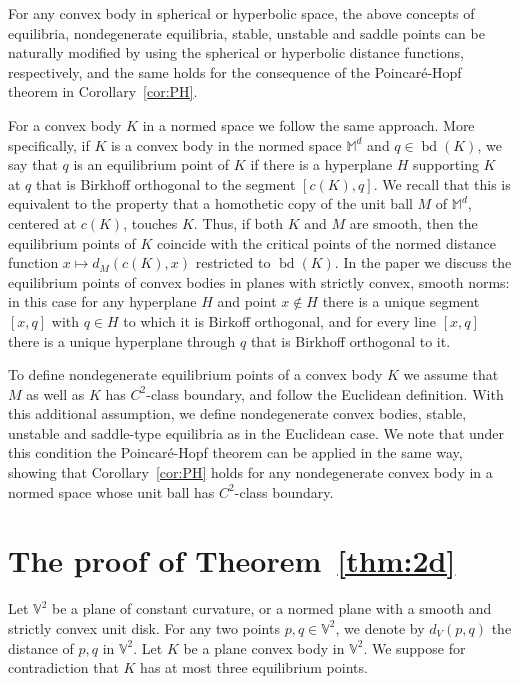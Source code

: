 \documentclass[twoside]{amsart}
\theoremstyle{plain}
\theoremstyle{definition}
\numberwithin{equation}{section}
\newcommand{\MM}{\mathbb{M}}
\newcommand{\V}{\mathbb{V}}
\DeclareMathOperator{\bd}{bd}
\begin{document}
For any convex body in spherical or hyperbolic space, the above concepts of equilibria, nondegenerate equilibria, stable, unstable and saddle points can be naturally modified by using the spherical or hyperbolic distance functions, respectively, and the same holds for the consequence of the Poincar\'e-Hopf theorem in Corollary~\ref{cor:PH}.

For a convex body $K$ in a normed space we follow the same approach. More specifically, if $K$ is a convex body in the normed space $\MM^d$ and $q \in \bd(K)$, we say that $q$ is an equilibrium point of $K$ if there is a hyperplane $H$ supporting $K$ at $q$ that is Birkhoff orthogonal to the segment $[c(K),q]$. We recall that this is equivalent to the property that a homothetic copy of the unit ball $M$ of $\MM^d$, centered at $c(K)$, touches $K$. Thus, if both $K$ and $M$ are smooth, then the equilibrium points of $K$ coincide with the critical points of the normed distance function $x \mapsto d_M(c(K),x)$ restricted to $\bd(K)$.
In the paper we discuss the equilibrium points of convex bodies in planes with strictly convex, smooth norms: in this case for any hyperplane $H$ and point $x \notin H$ there is a unique segment $[x,q]$ with $q \in H$ to which it is Birkoff orthogonal, and for every line $[x,q]$ there is a unique hyperplane through $q$  
that is Birkhoff orthogonal to it.

To define nondegenerate equilibrium points of a convex body $K$ we assume that $M$ as well as $K$ has $C^2$-class boundary, and follow the Euclidean definition. With this additional assumption, we define nondegenerate convex bodies, stable, unstable and saddle-type equilibria as in the Euclidean case. We note that under this condition the Poincar\'e-Hopf theorem can be applied in the same way, showing that Corollary~\ref{cor:PH} holds for any nondegenerate convex body in a normed space whose unit ball has $C^2$-class boundary. 





\section{The proof of Theorem~\ref{thm:2d}}\label{sec:2d}

Let $\V^2$ be a plane of constant curvature, or a normed plane with a smooth and strictly convex unit disk. For any two points $p,q \in \V^2$, we denote by $d_V(p,q)$ the distance of $p,q$ in $\V^2$. Let $K$ be a plane convex body in $\V^2$. We suppose for contradiction that $K$ has at most three equilibrium points.
\end{document}
